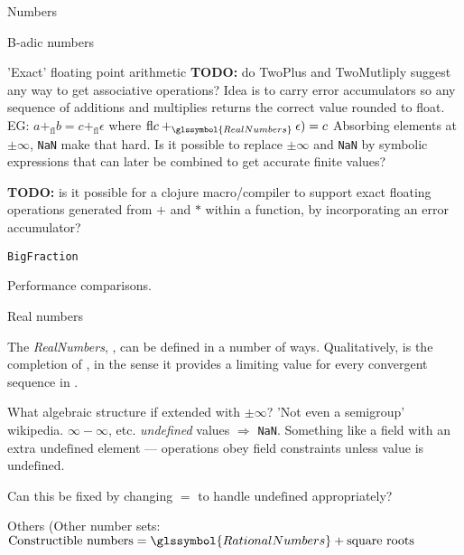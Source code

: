 \begin{plSection}{Numbers}
\begin{plSection}{B-adic numbers}
\begin{plSection}{'Exact' floating point arithmetic}
\textbf{TODO:} do TwoPlus and TwoMutliply 
suggest any way to get associative operations?
Idea is to carry error accumulators so 
any sequence of additions and multiplies 
returns the correct  value rounded to float.
EG: $ a +_{\text{fl}} b = c +_{\text{fl}} \epsilon$
where $\text{fl} c +_{\glssymbol{RealNumbers}} \epsilon) = c$
Absorbing elements at $\pm\infty$, \texttt{NaN} make that hard.
Is it possible to replace $\pm\infty$ and \texttt{NaN}
by symbolic expressions that can later be combined to get 
accurate finite values?


\textbf{TODO:} is it possible for a clojure macro/compiler
to support exact floating operations generated from
$+$ and $*$ within a function, by incorporating an error
accumulator?
\end{plSection}%
\begin{plSection}{\texttt{BigFraction}}
\label{sec:BigFraction}

Performance comparisons.

\end{plSection}%
\end{plSection}%
\begin{plSection}{Real numbers}
\label{sec:Real-numbers}

The \textit{\gls{RealNumbers}}, ,
can be defined in a number of ways. 
Qualitatively,  is the completion of
, 
in the sense it provides a limiting value for every
convergent sequence in .

What algebraic structure if extended with $\pm\infty$?
'Not even a semigroup' wikipedia.
$\infty - \infty$, etc. \textit{undefined} values $\Rightarrow$
\texttt{NaN}.
Something like a field with an extra $\text{undefined}$
element --- operations obey field constraints unless value is
$\text{undefined}$.

Can this be fixed by changing $=$ to handle $\text{undefined}$
appropriately?

\end{plSection}%
\begin{plSection}{Others}
(Other number sets:
$\text{Constructible numbers} = \glssymbol{RationalNumbers}
+ \text{square roots}$


\end{plSection}
\end{plSection}
